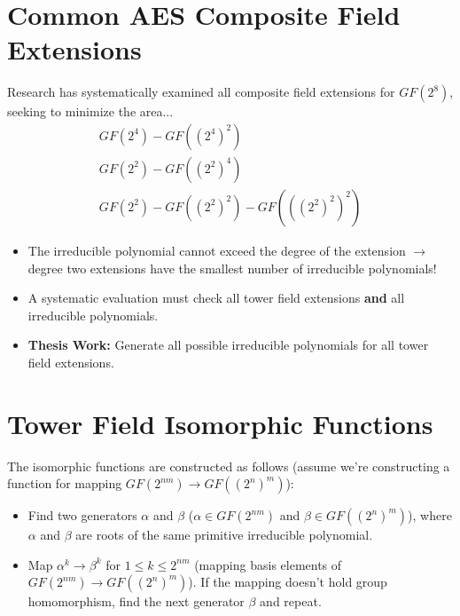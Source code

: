 \documentclass[handout]{beamer}
\begin{document}
\section{Common AES Composite Field Extensions}
\begin{frame}
Research has systematically examined all composite field extensions for $GF(2^8)$, seeking to minimize the area...
\begin{align*}
GF(2^4) - GF((2^4)^2) \\
GF(2^2) - GF((2^2)^4) \\
GF(2^2) - GF((2^2)^2) - GF(((2^2)^2)^2)
\end{align*}
\begin{itemize}
	\item The irreducible polynomial cannot exceed the degree of the extension $\to$ degree two extensions have the smallest number of irreducible polynomials!
	\item A systematic evaluation must check all tower field extensions \textbf{and} all irreducible polynomials.
	\item \textbf{Thesis Work:} Generate all possible irreducible polynomials for all tower field extensions.
\end{itemize}
\end{frame}

\section{Tower Field Isomorphic Functions}
\begin{frame}
The isomorphic functions are constructed as follows (assume we're constructing a function for mapping $GF(2^{nm}) \to GF((2^n)^m)$):
\begin{itemize}
	\item Find two generators $\alpha$ and $\beta$ ($\alpha \in GF(2^{nm})$ and $\beta \in GF((2^n)^m)$), where $\alpha$ and $\beta$ are roots of the same primitive irreducible polynomial. 
	\item Map $\alpha^k \to \beta^k$ for $1 \leq k \leq 2^{nm}$ (mapping basis elements of $GF(2^{nm}) \to GF((2^n)^m)$). If the mapping doesn't hold group homomorphism, find the next generator $\beta$ and repeat.
\end{itemize}
\end{frame}
\end{document}

